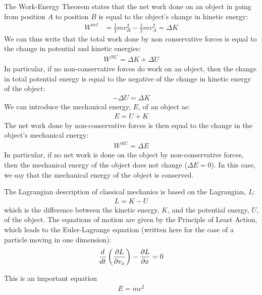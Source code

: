 \begin{chapterSummary}
The Work-Energy Theorem states that the net work done on an object in going from position $A$ to position $B$ is equal to the object's change in kinetic energy:
\begin{align*}
W^{net}&=\frac{1}{2}mv_B^2-\frac{1}{2}mv_A^2=\Delta K
\end{align*}
We can thus write that the total work done by non conservative forces is equal to the change in potential and kinetic energies:
\begin{align*}
W^{NC}=\Delta K+\Delta U
\end{align*}
In particular, if no non-conservative forces do work on an object, then the change in total potential energy is equal to the negative of the change in kinetic energy of the object:
\begin{align*}
-\Delta U=\Delta K
\end{align*}
We can introduce the mechanical energy, $E$, of an object as:
\begin{align*}
E = U+K
\end{align*}
The net work done by non-conservative forces is then equal to the change in the object's mechanical energy:
\begin{align*}
W^{NC}=\Delta E
\end{align*}
In particular, if no net work is done on the object by non-conservative forces, then the mechanical energy of the object does not change ($\Delta E=0$). In this case, we say that the mechanical energy of the object is conserved.

The Lagrangian description of classical mechanics is based on the Lagrangian, $L$:
\begin{align*}
L = K - U
\end{align*}
which is the difference between the kinetic energy, $K$, and the potential energy, $U$, of the object. The equations of motion are given by the Principle of Least Action, which leads to the Euler-Lagrange equation (written here for the case of a particle moving in one dimension):
\begin{align*}
\frac{d}{dt}\left(\frac{\partial L}{\partial v_x}\right)-\frac{\partial L}{\partial x} = 0
\end{align*}
\end{chapterSummary}

\newpage
\begin{importantEquations}
This is an important equation
\begin{align*}
E = mc^2
\end{align*}

\end{importantEquations}


